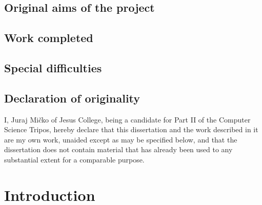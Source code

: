 \documentclass[12pt,a4paper,twoside,openany]{report}
\begin{document}
    \section*{Original aims of the project}



    \section*{Work completed}


    \newpage

    \section*{Special difficulties}



    \section*{Declaration of originality}

    I, Juraj Mi\v{c}ko of Jesus College, being a candidate for Part II of the Computer Science Tripos, hereby declare that this dissertation and the work described in it are my own work, unaided except as may be specified below, and that the dissertation does not contain material that has already been used to any substantial extent for a comparable purpose.

    \bigskip

    \medskip

    \tableofcontents

    \listoffigures

    \listoftables

    \lstlistoflistings


    \pagestyle{headings}


%    


    \chapter{Introduction}\label{ch:introduction}
    
\end{document}
